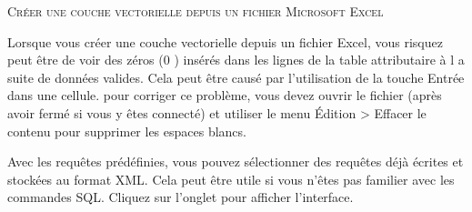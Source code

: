 
\begin{Tip}\caption{\textsc{Créer une couche vectorielle depuis un fichier Microsoft Excel}}
Lorsque vous créer une couche vectorielle depuis un fichier Excel, vous risquez peut être de voir des zéros (0 ) insérés dans les lignes de la table attributaire à l a suite de données valides. Cela peut être causé par l'utilisation de la touche Entrée dans une cellule. pour corriger ce problème, vous devez ouvrir le fichier (après avoir fermé \qg si vous y êtes connecté) et utiliser le menu Édition > Effacer le contenu pour supprimer les espaces blancs.
\end{Tip}

\label{evis_predefined}


Avec les requêtes prédéfinies, vous pouvez sélectionner des requêtes déjà écrites et stockées au format XML. Cela peut être utile si vous n'êtes pas familier avec les commandes SQL. Cliquez sur l'onglet  pour afficher l'interface.


